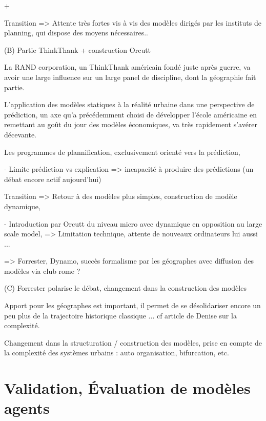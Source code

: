 +


Transition => Attente très fortes vis à vis des modèles dirigés par les instituts de planning, qui dispose des moyens nécessaires.. 


(B) Partie ThinkThank + construction Orcutt

La RAND corporation, un ThinkThank américain fondé juste après guerre, va avoir une large influence sur un large panel de discipline, dont la géographie fait partie.

L'application des modèles statiques à la réalité urbaine dans une perspective de prédiction, un axe qu'a précédemment choisi de développer l'école américaine en remettant au goût du jour des modèles économiques, va très rapidement s'avérer décevante.

Les programmes de plannification, exclusivement orienté vers la prédiction, 

- Limite prédiction vs explication => incapacité à produire des prédictions (un débat encore actif aujourd'hui)

Transition => Retour à des modèles plus simples, construction de modèle dynamique, 

- Introduction par Orcutt du niveau micro avec dynamique en opposition au large scale model, 
	=> Limitation technique, attente de nouveaux ordinateurs lui aussi ...

=> Forrester, Dynamo, succès formalisme par les géographes avec diffusion des modèles via club rome ?
 
(C) Forrester polarise le débat, changement dans la construction des modèles

Apport pour les géographes est important, il permet de se désolidariser encore un peu plus de la trajectoire historique classique ...  cf article de Denise sur la complexité.

Changement dans la structuration / construction des modèles, prise en compte de la complexité des systèmes urbains : auto organisation, bifurcation, etc. 

\section {Validation, Évaluation de modèles agents} 


